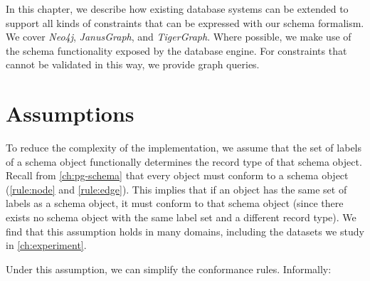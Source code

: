 \documentclass{report}
\theoremstyle{definition}
\begin{document}
In this chapter, we describe how existing database systems can be extended to support all kinds of constraints that can be expressed with our schema formalism. We cover \emph{Neo4j}, \emph{JanusGraph}, and \emph{TigerGraph}. Where possible, we make use of the schema functionality exposed by the database engine. For constraints that cannot be validated in this way, we provide graph queries.

\section{Assumptions}

To reduce the complexity of the implementation, we assume that the set of labels of a schema object functionally determines the record type of that schema object. Recall from \autoref{ch:pg-schema} that every object must conform to a schema object (\autoref{rule:node} and \ref{rule:edge}). This implies that if an object has the same set of labels as a schema object, it must conform to that schema object (since there exists no schema object with the same label set and a different record type). We find that this assumption holds in many domains, including the datasets we study in \autoref{ch:experiment}.

Under this assumption, we can simplify the conformance rules. Informally:
\end{document}
